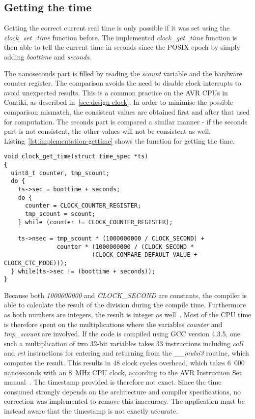 \subsection{Getting the time}
Getting the correct current real time is only possible if it was set using
the {\it{clock\_set\_time}} function before.
The implemented {\it{clock\_get\_time}} function is then able to tell the
current time in seconds since the POSIX epoch by simply adding {\it{boottime}}
and {\it{seconds}}.

The nanoseconds part is filled by reading the {\it{scount}} variable and the hardware counter register.
The comparison avoids the need to disable clock interrupts to avoid unexpected results.
This is a common practice on the AVR CPUs in Contiki, as described in~\ref{sec:design-clock}.
In order to minimise the possible comparison mismatch,
the consistent values are obtained first and after that used for computation.
The seconds part is compared a similar manner - if the seconds part is not consistent,
the other values will not be consistent as well.
Listing~\ref{lst:implementation-gettime} shows the function for getting the time.
\begin{lstlisting}[caption={Function for getting the time},label={lst:implementation-gettime}]
void clock_get_time(struct time_spec *ts)
{
  uint8_t counter, tmp_scount;
  do {
    ts->sec = boottime + seconds;
    do {
      counter = CLOCK_COUNTER_REGISTER;
      tmp_scount = scount;
    } while (counter != CLOCK_COUNTER_REGISTER);

    ts->nsec = tmp_scount * (1000000000 / CLOCK_SECOND) +
               counter * (1000000000 / (CLOCK_SECOND *
                         (CLOCK_COMPARE_DEFAULT_VALUE + CLOCK_CTC_MODE)));
  } while(ts->sec != (boottime + seconds));
}
\end{lstlisting}
Because both {\it{1000000000}} and {\it{CLOCK\_SECOND}} are constants, the compiler is able to
calculate the result of the division during the compile time.
Furthermore as both numbers are integers, the result is integer as well~\cite{c99}.
Most of the CPU time is therefore spent on the multiplications where the variables
{\it{counter}} and {\it{tmp\_scount}} are involved. %
If the code is compiled using GCC version 4.3.5,
one such a multiplication of two 32-bit variables takes 33 instructions including {\it{call}} and {\it{ret}}
instructions for entering and returning from the {\it{\_\_mulsi3}} routine, which computes the result.
This results in 48 clock cycles overhead,
which takes 6~000 nanoseconds with an 8~MHz CPU clock,
according to the AVR Instruction Set manual~\cite{avr-instruction-set}.
The timestamp provided is therefore not exact.
Since the time consumed strongly depends on the architecture and compiler specifications,
no correction was implemented to remove this inaccuracy.
The application must be instead aware that the timestamp is not exactly accurate.


